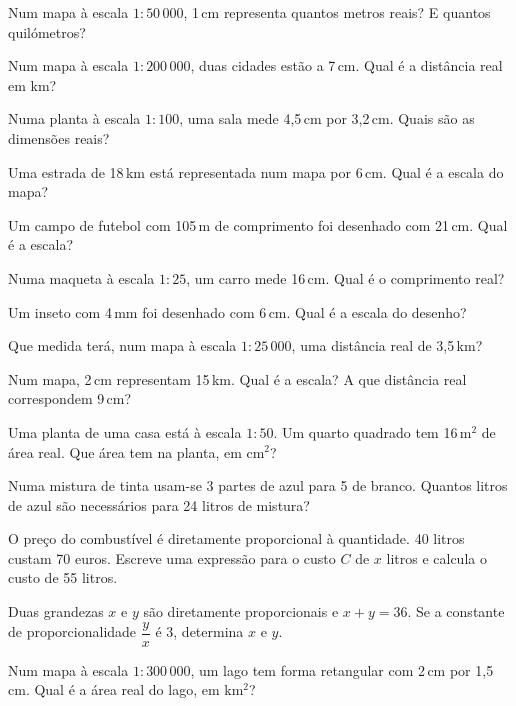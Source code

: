 \documentclass[12pt]{article}
\begin{document}
\begin{exercicios}
  \item Num mapa à escala $1:50\,000$, 1\,cm representa quantos metros reais? E quantos quilómetros?
  \item Num mapa à escala $1:200\,000$, duas cidades estão a 7\,cm. Qual é a distância real em km?
  \item Numa planta à escala $1:100$, uma sala mede 4,5\,cm por 3,2\,cm. Quais são as dimensões reais?
  \item Uma estrada de 18\,km está representada num mapa por 6\,cm. Qual é a escala do mapa?
  \item Um campo de futebol com 105\,m de comprimento foi desenhado com 21\,cm. Qual é a escala?
  \item Numa maqueta à escala $1:25$, um carro mede 16\,cm. Qual é o comprimento real?
  \item Um inseto com 4\,mm foi desenhado com 6\,cm. Qual é a escala do desenho?
  \item Que medida terá, num mapa à escala $1:25\,000$, uma distância real de 3,5\,km?
\end{exercicios}

\begin{exercicios}
  \item Num mapa, 2\,cm representam 15\,km. Qual é a escala? A que distância real correspondem 9\,cm?
  \item Uma planta de uma casa está à escala $1:50$. Um quarto quadrado tem 16\,m$^2$ de área real. Que área tem na planta, em cm$^2$?
  \item Numa mistura de tinta usam-se 3 partes de azul para 5 de branco. Quantos litros de azul são necessários para 24 litros de mistura?
  \item O preço do combustível é diretamente proporcional à quantidade. 40 litros custam 70 euros. Escreve uma expressão para o custo $C$ de $x$ litros e calcula o custo de 55 litros.
  \item Duas grandezas $x$ e $y$ são diretamente proporcionais e $x + y = 36$. Se a constante de proporcionalidade $\dfrac{y}{x}$ é 3, determina $x$ e $y$.
  \item Num mapa à escala $1:300\,000$, um lago tem forma retangular com 2\,cm por 1,5\,cm. Qual é a área real do lago, em km$^2$?
\end{exercicios}
\end{document}
